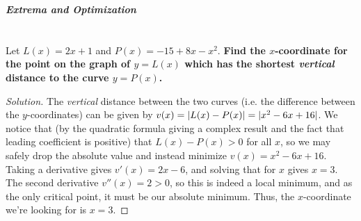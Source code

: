 \documentclass[english,fleqn]{article}
\DeclarePairedDelimiter\abs{\lvert}{\rvert}%
\newcommand{\prob}[1]{\setcounter{section}{#1-1}\section{}}
\newcommand{\prt}[1]{\setcounter{subsection}{#1-1}\subsection{}}
\theoremstyle{remark}
\theoremstyle{definition}
\begin{document}
		
	\begin{center}{\Large\textbf{\emph{Extrema and Optimization}}}\end{center}
	\prob{10} Let $L(x)=2x+1$ and $P(x)=-15+8x-x^2$.
\textbf{ Find the $x$-coordinate for the point on the graph of $y=L(x)$ which has the shortest \emph{vertical} distance to the curve $y=P(x)$. }%
	\begin{proof}[Solution]
The \emph{vertical} distance between the two curves (i.e. the difference between the $y$-coordinates) can be given by $v(x)=\abs{L(x)-P(x)}=\abs{x^2 - 6 x + 16}$. We notice that (by the quadratic formula giving a complex result and the fact that leading coefficient is positive) that $L(x)-P(x)>0$ for all $x$, so we may safely drop the absolute value and instead minimize $v(x)=x^2-6x+16$. Taking a derivative gives $v'(x)=2x-6$, and solving that for $x$ gives $x=3$. The second derivative $v''(x)=2>0$, so this is indeed a local minimum, and as the only critical point, it must be our absolute minimum. Thus, the $x$-coordinate we're looking for is $x=3$. 		\newpage
	
	\end{proof}
%		
%		
	
\end{document}
